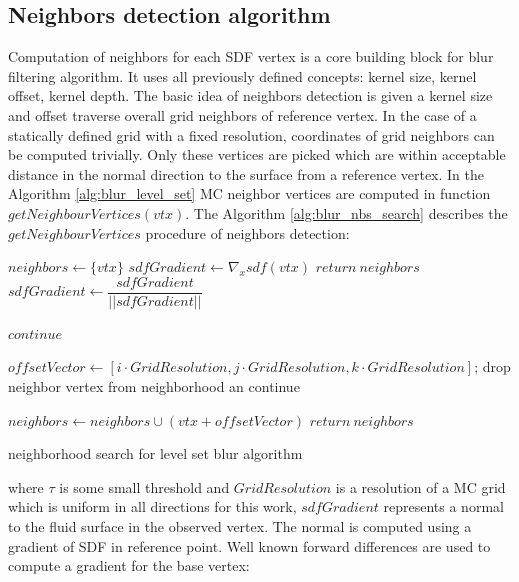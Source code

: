  \subsection{Neighbors detection algorithm}
Computation of neighbors for each SDF vertex is a core building block for blur filtering algorithm. It uses all previously defined concepts: kernel size, kernel offset, kernel depth. The basic idea of neighbors detection is given a kernel size and offset traverse overall grid neighbors of reference vertex. In the case of a statically defined grid with a fixed resolution, coordinates of grid neighbors can be computed trivially. Only these vertices are picked which are within acceptable distance in the normal direction to the surface from a reference vertex.
In the Algorithm \ref{alg:blur_level_set} MC neighbor vertices are computed in function $getNeighbourVertices(vtx)$. The Algorithm \ref{alg:blur_nbs_search} describes the $getNeighbourVertices$ procedure of neighbors detection:
\begin{algorithm}[H]
	\scriptsize
	\begin{algorithmic}
		\State $neighbors \gets \{vtx\}$
		\State $sdfGradient \gets \nabla_x sdf(vtx)$
			\State $return\ neighbors$
		\EndIf
		\State $sdfGradient \gets \dfrac{sdfGradient}{||sdfGradient||}$
		
						\State $continue$
					\EndIf
					
					\State $offsetVector \gets [i \cdot GridResolution, j \cdot GridResolution, k \cdot GridResolution]$;
						\State drop neighbor vertex from neighborhood an continue
					\EndIf
					
					\State $neighbors \gets neighbors \cup (vtx + offsetVector)$
				\EndFor
			\EndFor
		\EndFor
		\State $return\ neighbors$
	\end{algorithmic}
	\caption{neighborhood search for level set blur algorithm}
	\label{alg:blur_nbs_search}
\end{algorithm}
where $\tau$ is some small threshold and $GridResolution$ is a resolution of a MC grid which is uniform in all directions for this work, $sdfGradient$ represents a normal to the fluid surface in the observed vertex. The normal is computed using a gradient of SDF in reference point. Well known forward differences are used to compute a gradient for the base vertex:
